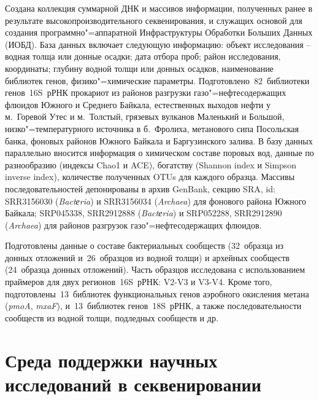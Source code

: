 \documentclass[a4paper,12pt,openany,final]{extreport}
\newcommand\MA[2]{{\sffamily\color{red}\hsmash{$\uparrow$}%
  \smash{\toplap{#1}{\scriptsize\bfseries #2}}}}
\renewcommand\MA[2]{}
\begin{document}
Создана коллекция суммарной ДНК и массивов информации, полученных ранее в результате высокопроизводительного секвенирования, и служащих основой для создания программно"=аппаратной Инфраструктуры Обработки Больших Данных (ИОБД). База данных включает следующую информацию: объект исследования -- водная толща или донные осадки; дата отбора проб; район исследования, координаты; глубину водной толщи или донных осадков, наименование библиотек генов, физико"=химические параметры. Подготовлено~82~библиотеки генов~16S~рРНК прокариот из районов разгрузки газо"=нефтесодержащих флюидов Южного и Среднего Байкала, естественных выходов нефти у м.~Горевой Утес и м.~Толстый, грязевых вулканов Маленький и Большой, низко"=температурного источника в б.~Фролиха, метанового сипа Посольская банка, фоновых районов Южного Байкала и Баргузинского залива. В базу данных параллельно вносится информация о химическом составе поровых вод, данные по разнообразию (индексы Chao1 и ACE), богатству (Shannon index и Simpson inverse index), количестве полученных OTUs для каждого образца. Массивы последовательностей депонированы в архив GenBank, секцию SRA, id: SRR3156030 (\textit{Bactеria}) и SRR3156034 (\textit{Archaea}) для фонового района Южного Байкала; SRP045338, SRR2912888 (\textit{Bactеria}) и SRP052288, SRR2912890 (\textit{Archaea}) для районов разгрузок газо"=нефтесодержащих флюидов.

Подготовлены данные о составе бактериальных сообществ (32~образца из донных отложений и~26~образцов из водной толщи) и архейных сообществ (24~образца донных отложений). Часть образцов исследована с использованием праймеров для двух регионов~16S~рРНК: V2-V3\MA{c}{Есть ли какая-либо связь с главой \ref{chap:trim}?} и V3-V4. Кроме того, подготовлены~13~библиотек функциональных генов аэробного окисления метана (\emph{pmoA}, \emph{mxaF}), и~13~библиотек генов~18S~рРНК, а также последовательности сообществ из водной толщи, подледных сообществ и др.

\chapter{Среда поддержки научных исследований в секвенировании}\label{chap:5}\label{do:cherk}

\end{document}

